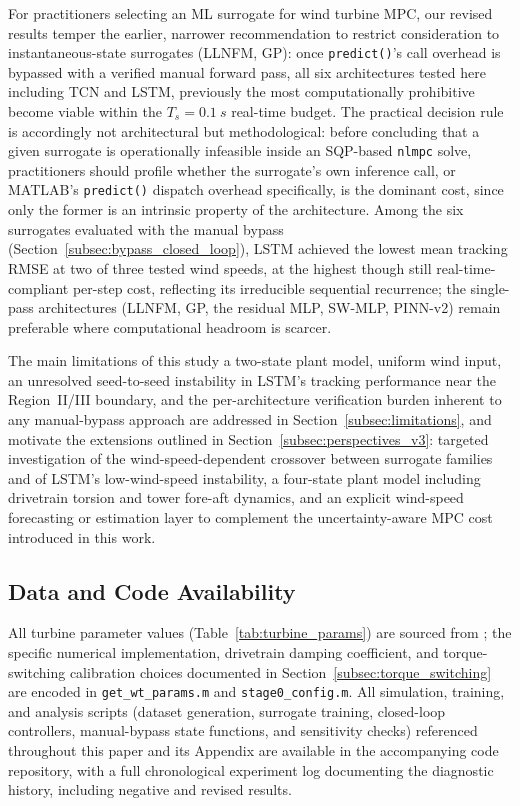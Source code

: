 For practitioners selecting an ML surrogate for wind turbine MPC, our
revised results temper the earlier, narrower recommendation to restrict
consideration to instantaneous-state surrogates (LLNFM, GP): once
\texttt{predict()}'s call overhead is bypassed with a verified manual
forward pass, all six architectures tested here  including TCN and
LSTM, previously the most computationally prohibitive  become viable
within the $T_s=\SI{0.1}{s}$ real-time budget. The practical decision
rule is accordingly not architectural but methodological: before
concluding that a given surrogate is operationally infeasible inside an
SQP-based \texttt{nlmpc} solve, practitioners should profile whether
the surrogate's own inference call, or MATLAB's \texttt{predict()}
dispatch overhead specifically, is the dominant cost, since only the
former is an intrinsic property of the architecture. Among the six
surrogates evaluated with the manual bypass
(Section~\ref{subsec:bypass_closed_loop}), LSTM achieved the lowest
mean tracking RMSE at two of three tested wind speeds, at the highest
 though still real-time-compliant  per-step cost, reflecting its
irreducible sequential recurrence; the single-pass architectures
(LLNFM, GP, the residual MLP, SW-MLP, PINN-v2) remain preferable where
computational headroom is scarcer.

The main limitations of this study  a two-state plant model, uniform
wind input, an unresolved seed-to-seed instability in LSTM's tracking
performance near the Region~II/III boundary, and the per-architecture
verification burden inherent to any manual-bypass approach  are
addressed in Section~\ref{subsec:limitations}, and motivate the
extensions outlined in Section~\ref{subsec:perspectives_v3}: targeted
investigation of the wind-speed-dependent crossover between surrogate
families and of LSTM's low-wind-speed instability, a four-state plant
model including drivetrain torsion and tower fore-aft dynamics, and an
explicit wind-speed forecasting or estimation layer to complement the
uncertainty-aware MPC cost introduced in this work.

\subsection*{Data and Code Availability}

All turbine parameter values (Table~\ref{tab:turbine_params}) are sourced
from \citet{jonkman2009}; the specific numerical implementation, drivetrain
damping coefficient, and torque-switching calibration choices documented
in Section~\ref{subsec:torque_switching} are encoded in
\texttt{get\_wt\_params.m} and \texttt{stage0\_config.m}. All simulation,
training, and analysis scripts (dataset generation, surrogate training,
closed-loop controllers, manual-bypass state functions, and sensitivity
checks) referenced throughout this paper and its Appendix are available in
the accompanying code repository, with a full chronological experiment
log documenting the diagnostic history, including negative and revised
results.
